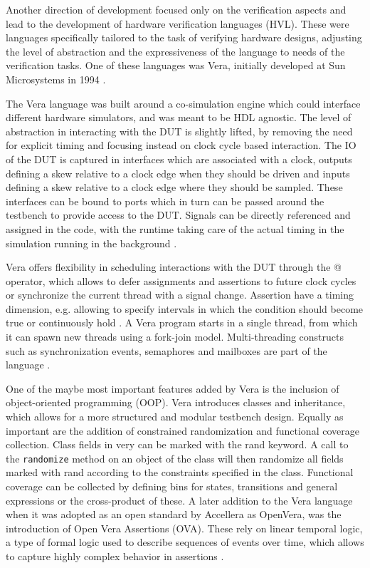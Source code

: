 \documentclass[12pt]{report}
\newcommand{\ttt}{\texttt}
\begin{document}
Another direction of development focused only on the verification aspects and lead to the development of hardware
verification languages (HVL). These were languages specifically tailored to the task of verifying hardware designs,
adjusting the level of abstraction and the expressiveness of the language to needs of the verification tasks. One of
these languages was Vera, initially developed at Sun Microsystems in 1994 \cite[Sec. 7]{flake2020a}.

The Vera language was built around a co-simulation engine which could interface different hardware simulators, and
was meant to be HDL agnostic. The level of abstraction in interacting with the DUT is slightly lifted, by removing
the need for explicit timing and focusing instead on clock cycle based interaction. The IO of the DUT is captured in
interfaces which are associated with a clock, outputs defining a skew relative to a clock edge when they should be
driven and inputs defining a skew relative to a clock edge where they should be sampled. These interfaces can be
bound to ports which in turn can be passed around the testbench to provide access to the DUT. Signals can be directly
referenced and assigned in the code, with the runtime taking care of the actual timing in the simulation running in
the background \cite[Sec. 7]{flake2020a}.

Vera offers flexibility in scheduling interactions with the DUT through the @ operator, which allows to defer
assignments and assertions to future clock cycles or synchronize the current thread with a signal change. Assertion
have a timing dimension, e.g. allowing to specify intervals in which the condition should become true or continuously
hold . A Vera program starts in a single thread, from which it can spawn new threads using a fork-join model.
Multi-threading constructs such as synchronization events, semaphores and mailboxes are part of the language
\cite[Sec. 7]{flake2020a}.

One of the maybe most important features added by Vera is the inclusion of object-oriented programming (OOP). Vera
introduces classes and inheritance, which allows for a more structured and modular testbench design. Equally as
important are the addition of constrained randomization and functional coverage collection. Class fields in very can
be marked with the rand keyword. A call to the \ttt{randomize} method on an object of the class will then randomize
all fields marked with rand according to the constraints specified in the class. Functional coverage can be collected
by defining bins for states, transitions and general expressions or the cross-product of these. A later addition to
the Vera language when it was adopted as an open standard by Accellera as OpenVera, was the introduction of Open Vera
Assertions (OVA). These rely on linear temporal logic, a type of formal logic used to describe sequences of events
over time, which allows to capture highly complex behavior in assertions \cite[Sec. 7]{flake2020a}.
\end{document}
